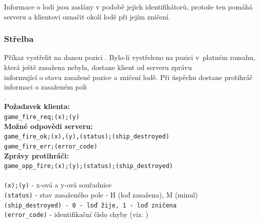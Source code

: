 \documentclass[12pt, a4paper]{article} %
\begin{document}
	\begin{notes}
		\item Informace o lodí jsou zaslány v podobě jejich identifikátorů, protože ten pomáhá serveru a klientovi označit okolí lodě při jejím zničení.
	\end{notes}	
	\subsubsection{Střelba}
	\par Příkaz vystřelit na danou pozici . Bylo-li vystřeleno na pozici v platném rozsahu, která ještě zasažena nebyla, dostane klient od serveru zprávu\\  informující o stavu zasažené pozice a zničení lodě. Při úspěchu dostane protihráč informaci o zasaženém poli\\ .\\
	\textbf{Požadavek klienta:}\\
	\texttt{game\_fire\_req;(x);(y)}\\
	\textbf{Možné odpovědi serveru:}\\
	\texttt{game\_fire\_ok;(x),(y),(status);(ship\_destroyed)}\\
	\texttt{game\_fire\_err;(error\_code)}\\
	\textbf{Zprávy protihráči:}\\
	\texttt{game\_opp\_fire;(x);(y);(status);(ship\_destroyed)}\\\\
	\texttt{(x);(y)} - x-ová a  y-ová souřadnice \\
	\texttt{(status)} - stav zasaženého pole - H (loď zasažena), M (minul)\\
	\texttt{(ship\_destroyed) - 0 - loď žije, 1 - loď zničena}\\
	\texttt{(error\_code)} - identifikační číslo chyby (viz. )
\end{document}
